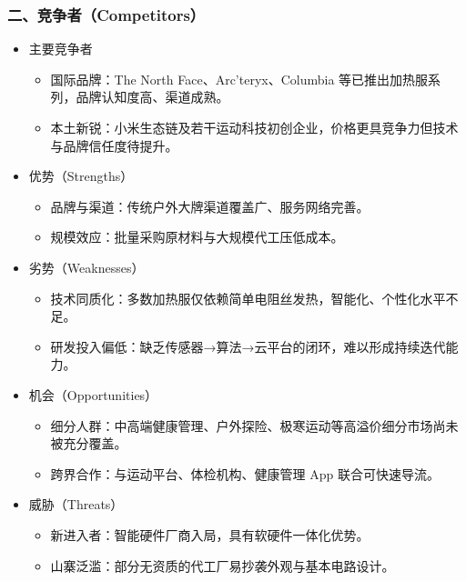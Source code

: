 \documentclass[UTF8]{report}
\theoremstyle{MyLineTheoremStyle} %
\theoremstyle{MyBlockTheoremStyle} %
\theoremstyle{MySubsubsectionStyle} %
\begin{document}
\subsubsection{二、竞争者（Competitors）}
    \begin{itemize}
      \item 主要竞争者
        \begin{itemize}
          \item 国际品牌：The North Face、Arc’teryx、Columbia 等已推出加热服系列，品牌认知度高、渠道成熟。
          \item 本土新锐：小米生态链及若干运动科技初创企业，价格更具竞争力但技术与品牌信任度待提升。
        \end{itemize}
      \item 优势（Strengths）
        \begin{itemize}
          \item 品牌与渠道：传统户外大牌渠道覆盖广、服务网络完善。
          \item 规模效应：批量采购原材料与大规模代工压低成本。
        \end{itemize}
      \item 劣势（Weaknesses）
        \begin{itemize}
          \item 技术同质化：多数加热服仅依赖简单电阻丝发热，智能化、个性化水平不足。
          \item 研发投入偏低：缺乏传感器→算法→云平台的闭环，难以形成持续迭代能力。
        \end{itemize}
      \item 机会（Opportunities）
        \begin{itemize}
          \item 细分人群：中高端健康管理、户外探险、极寒运动等高溢价细分市场尚未被充分覆盖。
          \item 跨界合作：与运动平台、体检机构、健康管理 App 联合可快速导流。
        \end{itemize}
      \item 威胁（Threats）
        \begin{itemize}
          \item 新进入者：智能硬件厂商入局，具有软硬件一体化优势。
          \item 山寨泛滥：部分无资质的代工厂易抄袭外观与基本电路设计。
        \end{itemize}
    \end{itemize}
\end{document}
